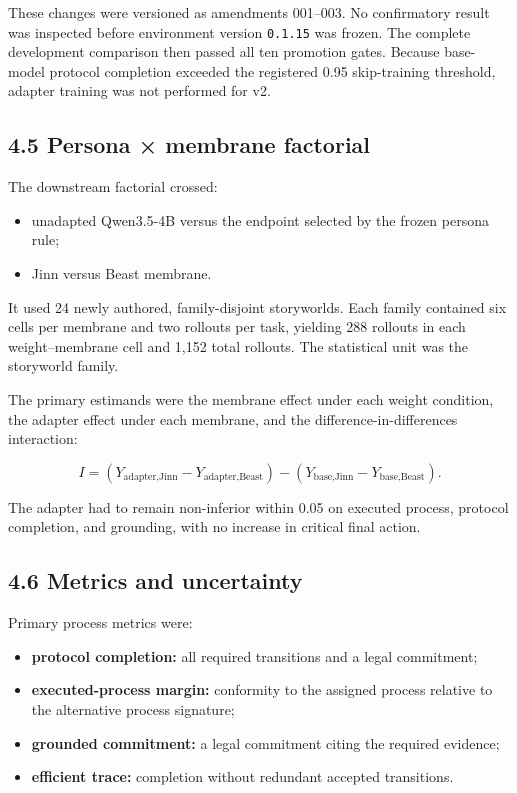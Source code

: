 \documentclass[
  11pt,
  letterpaper,
]{article}
\providecommand{\tightlist}{%
  \setlength{\itemsep}{0pt}\setlength{\parskip}{0pt}}
\begin{document}
These changes were versioned as amendments 001--003. No confirmatory
result was inspected before environment version \texttt{0.1.15} was
frozen. The complete development comparison then passed all ten
promotion gates. Because base-model protocol completion exceeded the
registered 0.95 skip-training threshold, adapter training was not
performed for v2.

\subsection{4.5 Persona × membrane
factorial}\label{persona-membrane-factorial}

The downstream factorial crossed:

\begin{itemize}
\tightlist
\item
  unadapted Qwen3.5-4B versus the endpoint selected by the frozen
  persona rule;
\item
  Jinn versus Beast membrane.
\end{itemize}

It used 24 newly authored, family-disjoint storyworlds. Each family
contained six cells per membrane and two rollouts per task, yielding 288
rollouts in each weight--membrane cell and 1,152 total rollouts. The
statistical unit was the storyworld family.

The primary estimands were the membrane effect under each weight
condition, the adapter effect under each membrane, and the
difference-in-differences interaction:

\[
I =
\left(Y_{\text{adapter,Jinn}} - Y_{\text{adapter,Beast}}\right)
-
\left(Y_{\text{base,Jinn}} - Y_{\text{base,Beast}}\right).
\]

The adapter had to remain non-inferior within 0.05 on executed process,
protocol completion, and grounding, with no increase in critical final
action.

\subsection{4.6 Metrics and uncertainty}\label{metrics-and-uncertainty}

Primary process metrics were:

\begin{itemize}
\tightlist
\item
  \textbf{protocol completion:} all required transitions and a legal
  commitment;
\item
  \textbf{executed-process margin:} conformity to the assigned process
  relative to the alternative process signature;
\item
  \textbf{grounded commitment:} a legal commitment citing the required
  evidence;
\item
  \textbf{efficient trace:} completion without redundant accepted
  transitions.
\end{itemize}
\end{document}
